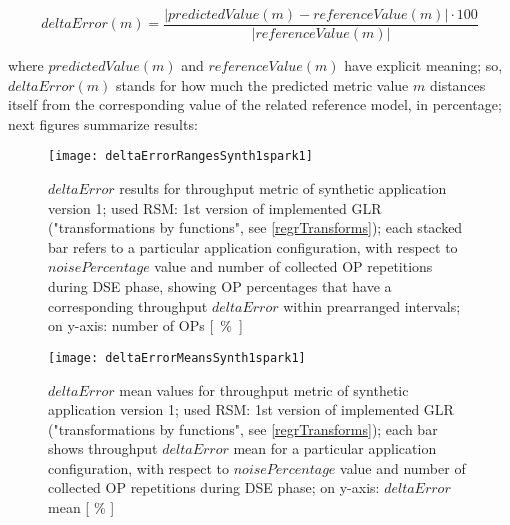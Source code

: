 \[
deltaError(m) = \dfrac{\left\vert predictedValue(m) - referenceValue(m) \right\vert \cdot 100}{\left\vert referenceValue(m) \right\vert}
\]

where $predictedValue(m)$ and $referenceValue(m)$ have explicit meaning; so, $deltaError(m)$ stands for how much the predicted metric value $m$ distances itself from the corresponding value of the related reference model, in percentage; next figures summarize results:





\begin{figure}[h]

    \centering
    
    \texttt{[image: deltaErrorRangesSynth1spark1]}
    
     \caption[$deltaError$ results for throughput metric of synthetic application version 1; used RSM: 1st version of implemented GLR ("transformations by functions")]{$deltaError$ results for throughput metric of synthetic application version 1; used RSM: 1st version of implemented GLR ("transformations by functions", see \ref{regrTransforms}); each stacked bar refers to a particular application configuration, with respect to $noisePercentage$ value and number of collected OP repetitions during DSE phase, showing OP percentages that have a corresponding throughput $deltaError$ within prearranged intervals; on y-axis: number of OPs \hbox{[ \% ]}}
    
    \label{fig::synth1spark1::intervals}
    
\end{figure}

\begin{figure}[h]

    \centering
    
    \texttt{[image: deltaErrorMeansSynth1spark1]}
    
    \caption[$deltaError$ mean values for throughput metric of synthetic application version 1; used RSM: 1st version of implemented GLR ("transformations by functions")]{$deltaError$ mean values for throughput metric of synthetic application version 1; used RSM: 1st version of implemented GLR ("transformations by functions", see \ref{regrTransforms}); each bar shows throughput $deltaError$ mean for a particular application configuration, with respect to $noisePercentage$ value and number of collected OP repetitions during DSE phase; on y-axis: $deltaError$ mean [ \% ]}
    
    \label{fig::synth1spark1::means}
    
\end{figure}





